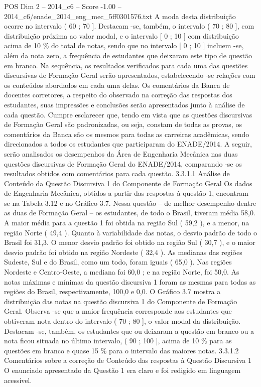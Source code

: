 \begin{textsample}{POS Dim 2 – 2014\_c6 – Score -1.00 – 2014\_c6/enade\_2014\_eng\_mec\_5ff0301576.txt}
A moda desta distribuição ocorre no intervalo ( 60 ; 70 ].
Destacam -se, também, o intervalo ( 70 ; 80 ], com distribuição próxima ao valor modal, e o intervalo [ 0 ; 10 ] com distribuição acima de 10 \% do total de notas, sendo que no intervalo [ 0 ; 10 ] incluem -se, além da nota zero, a frequência de estudantes que deixaram este tipo de questão em branco.
Na sequência, os resultados verificados para cada uma das questões discursivas de Formação Geral serão apresentados, estabelecendo -se relações com os conteúdos abordados em cada uma delas.
Os comentários da Banca de docentes corretores, a respeito do observado na correção das respostas dos estudantes, suas impressões e conclusões serão apresentados junto à análise de cada questão.
Cumpre esclarecer que, tendo em vista que as questões discursivas de Formação Geral são padronizadas, ou seja, constam de todas as provas, os comentários da Banca são os mesmos para todas as carreiras acadêmicas, sendo direcionados a todos os estudantes que participaram do ENADE/2014.
A seguir, serão analisados os desempenhos da Área de Engenharia Mecânica nas duas questões discursivas de Formação Geral do ENADE/2014, comparando -se os resultados obtidos com comentários para cada questão. 3.3.1.1 Análise de Conteúdo da Questão Discursiva 1 do Componente de Formação Geral Os dados de Engenharia Mecânica, obtidos a partir das respostas à questão 1, encontram -se na Tabela 3.12 e no Gráfico 3.7.
Nessa questão – de melhor desempenho dentre as duas de Formação Geral – os estudantes, de todo o Brasil, tiveram média 58,0.
A maior média para a questão 1 foi obtida na região Sul ( 59,2 ), e a menor, na região Norte ( 49,4 ).
Quanto à variabilidade das notas, o desvio padrão de todo o Brasil foi 31,3.
O menor desvio padrão foi obtido na região Sul ( 30,7 ), e o maior desvio padrão foi obtido na região Nordeste ( 32,4 ).
As medianas das regiões Sudeste, Sul e do Brasil, como um todo, foram iguais ( 65,0 ).
Nas regiões Nordeste e Centro-Oeste, a mediana foi 60,0 ; e na região Norte, foi 50,0.
As notas máximas e mínimas da questão discursiva 1 foram as mesmas para todas as regiões do Brasil, respectivamente, 100,0 e 0,0.
O Gráfico 3.7 mostra a distribuição das notas na questão discursiva 1 do Componente de Formação Geral.
Observa -se que a maior frequência corresponde aos estudantes que obtiveram nota dentro do intervalo ( 70 ; 80 ], o valor modal da distribuição.
Destacam -se, também, os estudantes que ou deixaram a questão em branco ou a nota ficou situada no último intervalo, ( 90 ; 100 ], acima de 10 \% para as questões em branco e quase 15 \% para o intervalo das maiores notas. 3.3.1.2 Comentários sobre a correção de Conteúdo das respostas à Questão Discursiva 1 O enunciado apresentado da Questão 1 era claro e foi redigido em linguagem acessível.

\end{textsample}
